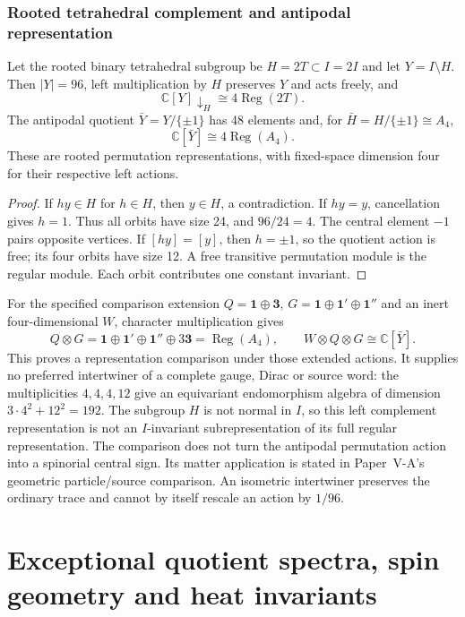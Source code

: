 \documentclass[11pt]{article}
\begin{document}
\section{Rooted tetrahedral complement and antipodal representation}
\label{p1:sec:v224-icosian-comparison}
\begin{proposition}
\label{p1:prop:v224-icosian-complement}
Let the rooted binary tetrahedral subgroup be $H=2T\subset I=2I$
and let $Y=I\setminus H$. Then $|Y|=96$, left multiplication by
$H$ preserves $Y$ and acts freely, and
\[
 \mathbb C[Y]\!\downarrow_H\cong4\operatorname{Reg}(2T).
\]
The antipodal quotient $\bar Y=Y/\{\pm1\}$ has 48 elements and,
for $\bar H=H/\{\pm1\}\cong A_4$,
\[
 \mathbb C[\bar Y]\cong4\operatorname{Reg}(A_4).
\]
These are rooted permutation representations, with fixed-space dimension
four for their respective left actions.
\end{proposition}
\begin{proof}
If $hy\in H$ for $h\in H$, then $y\in H$, a contradiction.
If $hy=y$, cancellation gives $h=1$. Thus all orbits have size
24, and $96/24=4$. The central element $-1$ pairs opposite vertices.
If $[hy]=[y]$, then $h=\pm1$, so the quotient action is free;
its four orbits have size 12. A free transitive permutation module is
the regular module. Each orbit contributes one constant invariant.
\end{proof}
For the specified comparison extension $Q=\mathbf1\oplus\mathbf3$,
$G=\mathbf1\oplus\mathbf1'\oplus\mathbf1''$ and an inert
four-dimensional $W$, character multiplication gives
\[
 Q\otimes G=\mathbf1\oplus\mathbf1'\oplus\mathbf1''
                  \oplus3\mathbf3=\operatorname{Reg}(A_4),
 \qquad W\otimes Q\otimes G\cong\mathbb C[\bar Y].
\]
This proves a representation comparison under those extended actions.
It supplies no preferred intertwiner of a complete gauge, Dirac or source
word: the multiplicities $4,4,4,12$ give an equivariant endomorphism
algebra of dimension $3\cdot4^2+12^2=192$. The subgroup $H$ is not
normal in $I$, so this left complement representation is not an
$I$-invariant subrepresentation of its full regular representation.
The comparison does not turn the antipodal permutation action into a
spinorial central sign. Its matter application is stated in
Paper~V-A's geometric particle/source comparison.
An isometric intertwiner preserves the ordinary trace and cannot by
itself rescale an action by $1/96$.



\part{Exceptional quotient spectra, spin geometry and heat invariants}
\end{document}
